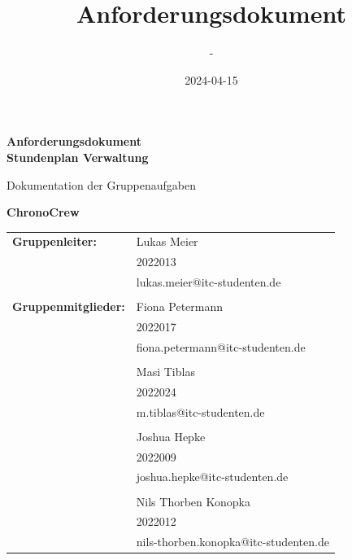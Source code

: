 \documentclass[11pt,a4paper]{article}
\title{Anforderungsdokument}
\date{2024-04-15}
\author{-}
\begin{document}
	\begin{titlepage}
		\begin{center}
			\Huge
			\textbf{Anforderungsdokument\\ Stundenplan Verwaltung}
			
			\vspace{0.5cm}
			\LARGE
			Dokumentation der Gruppenaufgaben
			
			\vspace{1.5cm}
			
			\textbf{ChronoCrew}
			
			\vspace{1.75cm}
			
			\vfill
			
			\vspace{1.0cm}
			\large
			\begin{tabular}{p{8cm}l}
				\textbf{Gruppenleiter:} & Lukas Meier\\
				& 2022013\\
				& lukas.meier@itc-studenten.de\\ 
				&\\
				\textbf{Gruppenmitglieder:} & Fiona Petermann\\
				& 2022017\\
				& fiona.petermann@itc-studenten.de\\
				&\\
				& Masi Tiblas\\
				& 2022024\\
				& m.tiblas@itc-studenten.de\\
				&\\
				& Joshua Hepke\\
				& 2022009\\
				& joshua.hepke@itc-studenten.de\\
				&\\
				& Nils Thorben Konopka\\
				& 2022012\\
				& nils-thorben.konopka@itc-studenten.de
			\end{tabular}
			\vfill
		\end{center}
	\end{titlepage}
	
	\newpage
	
	\setcounter{tocdepth}{2}
	\setcounter{secnumdepth}{3}
	\tableofcontents
	
	\newpage
	
	
	
	
	
	
	
	
	
	
	
	
	
\end{document}
